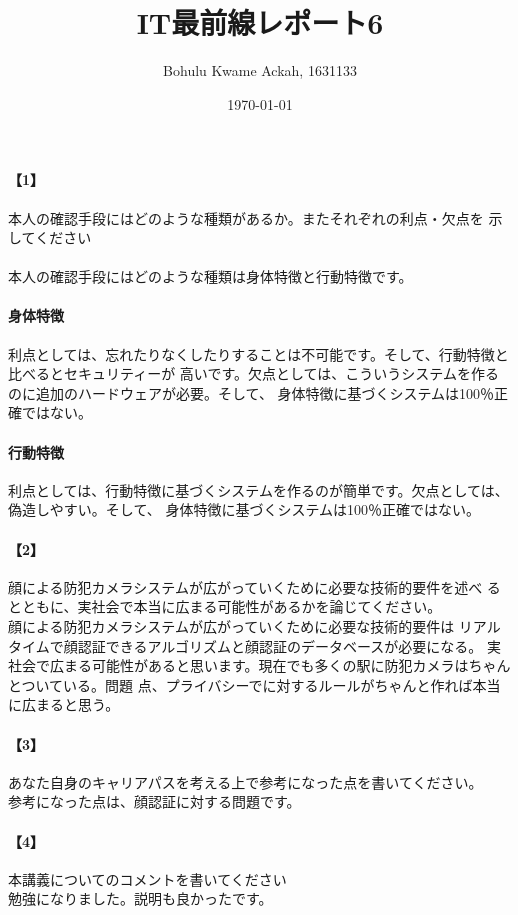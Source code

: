 \documentclass[20 pts]{article}
\title{IT最前線レポート6}
\author{Bohulu Kwame Ackah, 1631133}
\date{\today}
\begin{document}
\maketitle

\newpage
\paragraph{【1】}本人の確認手段にはどのような種類があるか。またそれぞれの利点・欠点を
示してください \\
\paragraph{}
本人の確認手段にはどのような種類は身体特徴と行動特徴です。
\vspace{8mm}
\paragraph{身体特徴}
利点としては、忘れたりなくしたりすることは不可能です。そして、行動特徴と比べるとセキュリティーが
高いです。欠点としては、こういうシステムを作るのに追加のハードウェアが必要。そして、
身体特徴に基づくシステムは100％正確ではない。
\vspace{8mm}　　　　　　　　　　
\paragraph{行動特徴}
利点としては、行動特徴に基づくシステムを作るのが簡単です。欠点としては、偽造しやすい。そして、
身体特徴に基づくシステムは100％正確ではない。



\vspace{8mm}
\paragraph{【2】}顔による防犯カメラシステムが広がっていくために必要な技術的要件を述べ
るとともに、実社会で本当に広まる可能性があるかを論じてください。\\

顔による防犯カメラシステムが広がっていくために必要な技術的要件は
リアルタイムで顔認証できるアルゴリズムと顔認証のデータベースが必要になる。
実社会で広まる可能性があると思います。現在でも多くの駅に防犯カメラはちゃんとついている。問題
点、プライバシーでに対するルールがちゃんと作れば本当に広まると思う。





\newpage
\paragraph{【3】}あなた自身のキャリアパスを考える上で参考になった点を書いてください。\\
参考になった点は、顔認証に対する問題です。



\paragraph{【4】}本講義についてのコメントを書いてください\\
勉強になりました。説明も良かったです。
\end{document}
